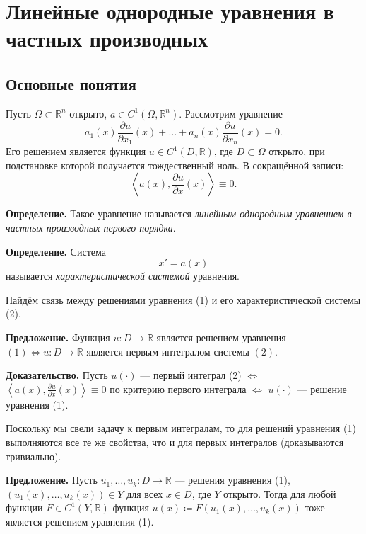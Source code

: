 \setcounter{equation}{0}
\section{Линейные однородные уравнения в частных производных}
\subsection{Основные понятия}
Пусть $\Omega \subset \mathbb R^n$ открыто, $a \in C^1(\Omega, \mathbb R^n)$.
Рассмотрим уравнение
\begin{equation}
    a_1(x)\frac{\partial u}{\partial x_1}(x) + \dots + a_n(x)\frac{\partial u}{\partial x_n}(x) = 0.
\end{equation}
Его решением является функция $u \in C^1(D, \mathbb R)$, где $D \subset \Omega$ открыто, при подстановке которой получается тождественный ноль.
В сокращённой записи:
\[
    \left<a(x), \frac{\partial u}{\partial x}(x)\right> \equiv 0.
\]

\textbf{Определение.} Такое уравнение называется \textit{линейным однородным уравнением в частных производных первого порядка}.

\textbf{Определение.} Система
\begin{equation}
    x' = a(x)
\end{equation}
называется \textit{характеристической системой} уравнения.

Найдём связь между решениями уравнения (1) и его характеристической системы (2).

\textbf{Предложение.} Функция $u \colon D \to \mathbb{R}$ является решением уравнения $(1) \Leftrightarrow u \colon D \to \mathbb{R}$ является первым интегралом системы $(2)$. 

\textbf{Доказательство.} Пусть $u(\cdot)$ --- первый интеграл (2) $\Leftrightarrow$ $\left<a(x), \frac{\partial u}{\partial x}(x) \right> \equiv 0$ по критерию первого интеграла $\Leftrightarrow$ $u(\cdot)$ --- решение уравнения (1).

\QED

Поскольку мы свели задачу к первым интегралам, то для решений уравнения (1) выполняются все те же свойства, что и для первых интегралов (доказываются тривиально).

\textbf{Предложение.} Пусть $u_1, \dots, u_k\colon D \to \mathbb{R}$ --- решения уравнения (1), $(u_1(x), \dots, u_k(x)) \in Y$ для всех $x \in D$, где $Y$ открыто. Тогда для любой функции $F \in C^1(Y, \mathbb{R})$ функция
$u(x) \coloneq F(u_1(x), \dots, u_k(x))$ тоже является решением уравнения (1).

